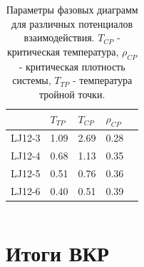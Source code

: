 \documentclass[pdf,hyperref={unicode}]{beamer}
\begin{document}
\begin{frame}
\begin{columns}
\begin{column}{0.45\linewidth}
{
\tiny{
\begin{table}[h]
\begin{tabular}{| l | l | l | l | l |}
\hline
    & $T_{TP}$  & $T_{CP}$  & $\rho_{CP}$   \\ \hline
LJ12-3  & 1.09  &  2.69   &  0.28   \\ \hline
LJ12-4  & 0.68  & 1.13    & 0.35    \\ \hline
LJ12-5  & 0.51  &  0.76   &  0.36   \\ \hline
LJ12-6  & 0.40  &  0.51   &  0.39   \\ \hline
\end{tabular}
\caption{\tiny Параметры фазовых диаграмм для различных потенциалов взаимодействия. $T_{CP}$ - критическая температура, $\rho_{CP}$ - критическая плотность системы, $T_{TP}$ - температура тройной точки.}
\label{tablSystemConst}
\end{table}
}
}
\end{column}

\end{columns}
\end{frame}




\section{Итоги ВКР}



\begin{frame}
\end{frame}
\end{document}
